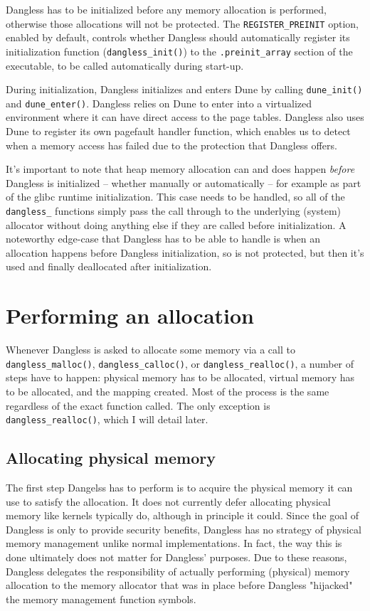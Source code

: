 Dangless has to be initialized before any memory allocation is performed, otherwise those allocations will not be protected. The \lstinline!REGISTER_PREINIT! option, enabled by default, controls whether Dangless should automatically register its initialization function (\lstinline!dangless_init()!) to the \lstinline!.preinit_array! section of the executable, to be called automatically during start-up.

During initialization, Dangless initializes and enters Dune by calling \lstinline!dune_init()! and \lstinline!dune_enter()!. Dangless relies on Dune to enter into a virtualized environment where it can have direct access to the page tables. Dangless also uses Dune to register its own pagefault handler function, which enables us to detect when a memory access has failed due to the protection that Dangless offers.

It's important to note that heap memory allocation can and does happen \emph{before} Dangless is initialized -- whether manually or automatically -- for example as part of the glibc runtime initialization. This case needs to be handled, so all of the \lstinline!dangless_! functions simply pass the call through to the underlying (system) allocator without doing anything else if they are called before initialization. A noteworthy edge-case that Dangless has to be able to handle is when an allocation happens before Dangless initialization, so is not protected, but then it's used and finally deallocated after initialization.

\section{Performing an allocation}

Whenever Dangless is asked to allocate some memory via a call to \lstinline!dangless_malloc()!, \lstinline!dangless_calloc()!, or \lstinline!dangless_realloc()!, a number of steps have to happen: physical memory has to be allocated, virtual memory has to be allocated, and the mapping created. Most of the process is the same regardless of the exact function called. The only exception is \lstinline!dangless_realloc()!, which I will detail later.

\subsection{Allocating physical memory}

The first step Dangelss has to perform is to acquire the physical memory it can use to satisfy the allocation. It does not currently defer allocating physical memory like kernels typically do, although in principle it could.
Since the goal of Dangless is only to provide security benefits, Dangless has no strategy of physical memory management unlike normal implementations. In fact, the way this is done ultimately does not matter for Dangless' purposes. Due to these reasons, Dangless delegates the responsibility of actually performing (physical) memory allocation to the memory allocator that was in place before Dangless "hijacked" the memory management function symbols.

